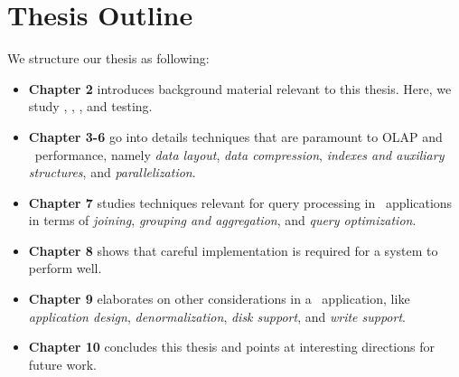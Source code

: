 \section{Thesis Outline}
\label{sec:Thesis Outline}
We structure our thesis as following:
\begin{itemize}
  \item \textbf{Chapter 2} introduces background material relevant to this thesis. Here, we study \bi, \bd, \genusSoftware, and testing.
  \item \textbf{Chapter 3-6} go into details techniques that are paramount to OLAP and \bd~performance, namely \textit{data layout}, \textit{data compression}, \textit{indexes and auxiliary structures}, and \textit{parallelization}.
  \item \textbf{Chapter 7} studies techniques relevant for query processing in \bd~applications in terms of \textit{joining}, \textit{grouping and aggregation}, and \textit{query optimization}.
  \item \textbf{Chapter 8} shows that careful implementation is required for a system to perform well.
  \item \textbf{Chapter 9} elaborates on other considerations in a \bd~application, like \textit{application design}, \textit{denormalization}, \textit{disk support}, and \textit{write support}.
  \item \textbf{Chapter 10} concludes this thesis and points at interesting directions for future work.
\end{itemize}
